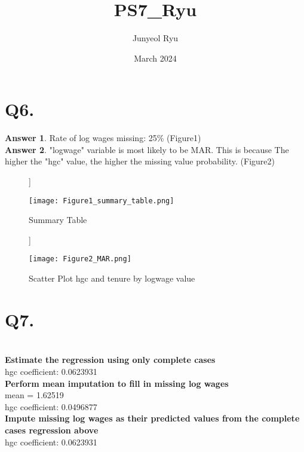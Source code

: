 \documentclass{article}
\title{PS7\_Ryu}
\author{Junyeol Ryu}
\date{March 2024}
\begin{document}
\maketitle

\section{Q6.}

\textbf{Answer 1}. Rate of log wages missing: 25\% (Figure1)
\\
\textbf{Answer 2}. "logwage" variable is most likely to be MAR. This is because The higher the "hgc" value, the higher the missing value probability. (Figure2)



\begin{figure}[[htb!]]
    \centering
            \caption{Summary Table}
        \texttt{[image: Figure1\_summary\_table.png]}
        \label{fig:88mono}
\end{figure}


\begin{figure}[[htb!]]
    \centering
            \caption{Scatter Plot hgc and tenure by logwage value}
        \texttt{[image: Figure2\_MAR.png]}
        \label{fig:88mono}
\end{figure}





\section{Q7.}
\\
\textbf{Estimate the regression using only complete cases}
\\ hgc coefficient: 0.0623931
\\
\textbf{Perform mean imputation to fill in missing log wages}
\\ mean = 1.62519
\\ hgc coefficient: 0.0496877
\\
\textbf{Impute missing log wages as their predicted values from the complete cases regression above}
\\ hgc coefficient: 0.0623931
\end{document}
